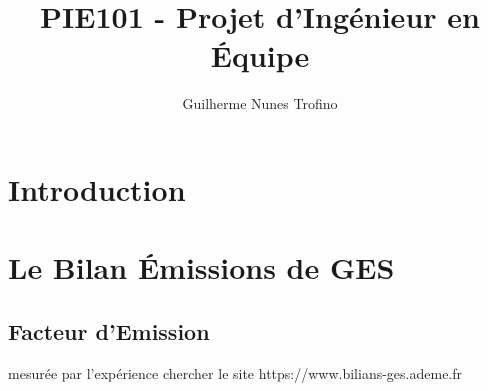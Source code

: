 \documentclass{article}
\title{PIE101 - Projet d'Ingénieur en Équipe}
\author{Guilherme Nunes Trofino}
\begin{document}
\maketitle

\newpage\tableofcontents

\section{Introduction}
\section{Le Bilan Émissions de GES}
\subsection{Facteur d'Emission}
mesurée par l'expérience
chercher le site https://www.bilians-ges.ademe.fr
\end{document}
